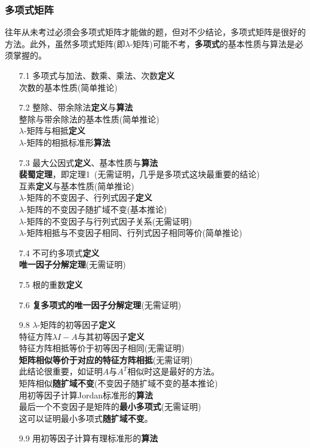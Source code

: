 \documentclass[a4paper,UTF8,fontset=windows,AutoFakeBold]{ctexart}
\newcommand*{\note}{\noindent *}
\begin{document}
\subsubsection{多项式矩阵}
往年从未考过必须会多项式矩阵才能做的题，但对不少结论，多项式矩阵是很好的方法。此外，虽然多项式矩阵(即$\lambda$-矩阵)可能不考，\textbf{多项式}的基本性质与算法是必须掌握的。
\begin{enumerate}
    \item[7.1] 多项式与加法、数乘、乘法、次数\textbf{定义}
    \\次数的基本性质(简单推论)
    \item[7.2] 整除、带余除法\textbf{定义}与\textbf{算法}
    \\整除与带余除法的基本性质(简单推论)
    \\$\lambda$-矩阵与相抵\textbf{定义}
    \\$\lambda$-矩阵的相抵标准形\textbf{算法}
    \item[7.3] 最大公因式\textbf{定义}、基本性质与\textbf{算法}
    \\\textbf{裴蜀定理}，即定理1\ (无需证明，几乎是多项式这块最重要的结论)
    \\互素\textbf{定义}与基本性质(简单推论)
    \\$\lambda$-矩阵的不变因子、行列式因子\textbf{定义}
    \\$\lambda$-矩阵的不变因子随扩域不变(基本推论)
    \\$\lambda$-矩阵的不变因子与行列式因子关系(无需证明)
    \\$\lambda$-矩阵相抵与不变因子相同、行列式因子相同等价(简单推论)
    \item[7.4] 不可约多项式\textbf{定义}
    \\\textbf{唯一因子分解定理}(无需证明)
    \item[7.5] 根的重数\textbf{定义}
    \item[7.6] \textbf{复多项式的唯一因子分解定理}(无需证明)
    \item[9.8] $\lambda$-矩阵的初等因子\textbf{定义}
    \\特征方阵$\lambda I-A$与其初等因子\textbf{定义}
    \\特征方阵相抵等价于初等因子相同(无需证明)
    \\\textbf{矩阵相似等价于对应的特征方阵相抵}(无需证明)
    \\\note 此结论很重要，如证明$A$与$A^T$相似时这是最好的方法。
    \\矩阵相似\textbf{随扩域不变}(不变因子随扩域不变的基本推论)
    \\用初等因子计算Jordan标准形的\textbf{算法}
    \\最后一个不变因子是矩阵的\textbf{最小多项式}(无需证明)
    \\\note 这可以证明最小多项式\textbf{随扩域不变}。
    \item[9.9] 用初等因子计算有理标准形的\textbf{算法}
\end{enumerate}
\end{document}
